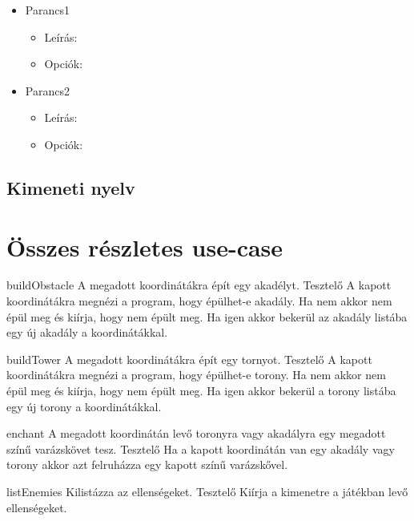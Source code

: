 \begin{itemize}
\item Parancs1
	\begin{itemize}
	\item Leírás:
	\item Opciók:
	\end{itemize}
\item Parancs2
	\begin{itemize}
	\item Leírás:
	\item Opciók:
	\end{itemize}

\end{itemize}


\subsection{Kimeneti nyelv}

\section{Összes részletes use-case}

\usecase
{buildObstacle}
{A megadott koordinátákra épít egy akadélyt.}
{Tesztelő}
{A kapott koordinátákra megnézi a program, hogy épülhet-e akadály. Ha nem akkor nem épül meg és kiírja, hogy nem épült meg. 
Ha igen akkor bekerül az akadály listába egy új akadály a koordinátákkal.}

\usecase
{buildTower}
{A megadott koordinátákra épít egy tornyot.}
{Tesztelő}
{A kapott koordinátákra megnézi a program, hogy épülhet-e torony. Ha nem akkor nem épül meg és kiírja, hogy nem épült meg. 
Ha igen akkor bekerül a torony listába egy új torony a koordinátákkal.}

\usecase
{enchant}
{A megadott koordinátán levő toronyra vagy akadályra egy megadott színű varázskövet tesz. }
{Tesztelő}
{Ha a kapott koordinátán van egy akadály vagy torony akkor azt felruházza egy kapott színű varázskővel.}

\usecase
{listEnemies}
{Kilistázza az ellenségeket.}
{Tesztelő}
{Kiírja a kimenetre a játékban levő ellenségeket.}

